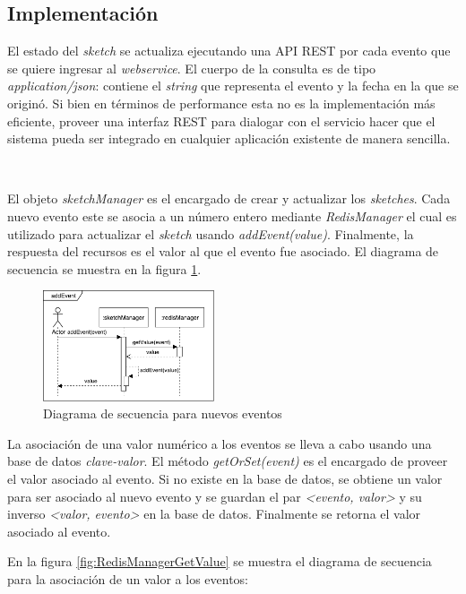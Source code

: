 \documentclass[a4paper,10pt, oneside]{article}
\begin{document}
\subsection*{Implementación}

El estado del \textit{sketch} se actualiza ejecutando una API REST por cada evento que se quiere ingresar al \textit{webservice}. El cuerpo de la consulta es de tipo \textit{application/json}\cite{rfc4627}: contiene el \textit{string} que representa el evento y la fecha en la que se originó. Si bien en términos de performance esta no es la implementación más eficiente, proveer una interfaz REST para dialogar con el servicio hacer que el sistema pueda ser integrado en cualquier aplicación existente de manera sencilla. 

\

El objeto \textit{sketchManager} es el encargado de crear y actualizar los \textit{sketches}. Cada nuevo evento este se asocia a un número entero mediante \textit{RedisManager} el cual es utilizado para actualizar el \textit{sketch} usando \textit{addEvent(value)}. Finalmente, la respuesta del recursos es el valor al que el evento fue asociado. El diagrama de secuencia se muestra en la figura \ref{fig:SecDiagResourceAddEvent}.

\begin{figure}[htbp]
	\centering
	\includegraphics[width=0.45\textwidth]{graph/SecDiag-resourceAddEvent.pdf}
	\caption{Diagrama de secuencia para nuevos eventos}
	\label{fig:SecDiagResourceAddEvent}
\end{figure}

La asociación de una valor numérico a los eventos se lleva a cabo usando una base de datos \textit{clave-valor}. El método \textit{getOrSet(event)} es el encargado de proveer el valor asociado al evento. Si no existe en la base de datos, se obtiene un valor para ser asociado al nuevo evento y se guardan el par \textit{<evento, valor>} y su inverso \textit{<valor, evento>} en la base de datos. Finalmente se retorna el valor asociado al evento.

En la figura \ref{fig:RedisManagerGetValue} se muestra el diagrama de secuencia para la asociación de un valor a los eventos:
\end{document}
